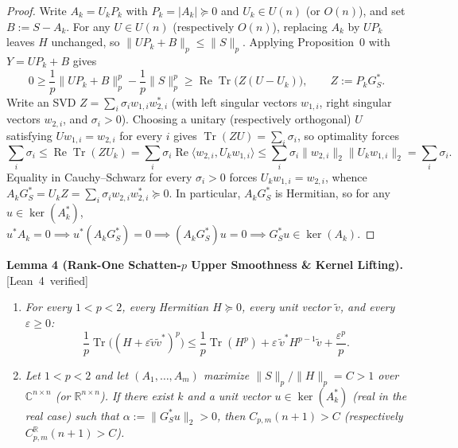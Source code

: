 \documentclass[10pt,letterpaper]{article}
\newcommand{\leanbadge}[1]{\mbox{\sffamily\scriptsize\color{leanborder}[#1]}}
\newcommand{\C}{\mathbb{C}}
\newcommand{\R}{\mathbb{R}}
\newcommand{\Tr}{\operatorname{Tr}}
\begin{document}
\begin{proof}
Write $A_k = U_k P_k$ with $P_k = |A_k| \succeq 0$ and $U_k \in U(n)$ (or $O(n)$), and set $B := S - A_k$. For any $U \in U(n)$ (respectively $O(n)$), replacing $A_k$ by $U P_k$ leaves $H$ unchanged, so $\|U P_k + B\|_p \le \|S\|_p$. Applying Proposition~0 with $Y = U P_k + B$ gives
\[
  0 \ge \frac{1}{p}\|U P_k + B\|_p^p - \frac{1}{p}\|S\|_p^p \ge \operatorname{Re}\Tr\bigl(Z(U - U_k)\bigr),
  \qquad Z := P_k G_S^*.
\]
Write an SVD $Z = \sum_i \sigma_i w_{1,i} w_{2,i}^*$ (with left singular vectors $w_{1,i}$, right singular vectors $w_{2,i}$, and $\sigma_i > 0$). Choosing a unitary (respectively orthogonal) $U$ satisfying $U w_{1,i} = w_{2,i}$ for every $i$ gives $\Tr(Z U) = \sum_i \sigma_i$, so optimality forces
\[
  \sum_i \sigma_i \le \operatorname{Re}\Tr(Z U_k) = \sum_i \sigma_i \operatorname{Re}\langle w_{2,i}, U_k w_{1,i}\rangle \le \sum_i \sigma_i \|w_{2,i}\|_2 \|U_k w_{1,i}\|_2 = \sum_i \sigma_i.
\]
Equality in Cauchy--Schwarz for every $\sigma_i > 0$ forces $U_k w_{1,i} = w_{2,i}$, whence $A_k G_S^* = U_k Z = \sum_i \sigma_i w_{2,i} w_{2,i}^* \succeq 0$. In particular, $A_k G_S^*$ is Hermitian, so for any $u \in \ker(A_k^*)$, $u^* A_k = 0 \implies u^*(A_k G_S^*) = 0 \implies (A_k G_S^*)u = 0 \implies G_S^* u \in \ker(A_k)$.
\end{proof}

\begin{tcolorbox}[lemmabox]
\textbf{Lemma 4 (Rank-One Schatten-$p$ Upper Smoothness \& Kernel Lifting).}\hfill\leanbadge{Lean~4 verified}\par\vspace{1.5pt}
\begin{enumerate}[label=(\alph*),leftmargin=1.8em,itemsep=2pt,topsep=2pt]
  \item \emph{For every $1 < p < 2$, every Hermitian $H \succeq 0$, every unit vector $\tilde{v}$, and every $\varepsilon \ge 0$:}
  \[
    \frac{1}{p}\Tr\bigl((H + \varepsilon \tilde{v}\tilde{v}^*)^p\bigr) \le \frac{1}{p}\Tr(H^p) + \varepsilon\,\tilde{v}^* H^{p-1}\tilde{v} + \frac{\varepsilon^p}{p}.
  \]
  \item \emph{Let $1 < p < 2$ and let $(A_1,\dots,A_m)$ maximize $\|S\|_p / \|H\|_p = C > 1$ over $\C^{n\times n}$ (or $\R^{n\times n}$). If there exist $k$ and a unit vector $u \in \ker(A_k^*)$ (real in the real case) such that $\alpha := \|G_S^* u\|_2 > 0$, then $C_{p,m}(n+1) > C$ (respectively $C_{p,m}^{\R}(n+1) > C$).}
\end{enumerate}
\end{tcolorbox}
\end{document}
